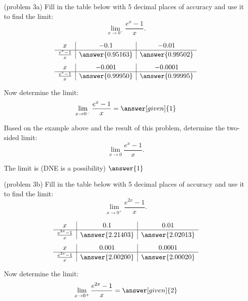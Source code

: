 \documentclass{ximera}
\begin{document}
\begin{problem}(problem 3a)
Fill in the table below with 5 decimal places of accuracy and use it to find the limit:
\[\lim_{x \to 0^-} \frac{e^x - 1}{x}.\]

\begin{prompt}
\begin{center}
\[
\begin{array}{ c | c | c }
  x & -0.1 & -0.01   \\ 
	\hline 
	 \frac{e^x - 1}{x} & \answer{0.95163} & \answer{0.99502} 
\end{array}
\]
\[
\begin{array}{ c | c | c  }
  x  & -0.001 & -0.0001 \\ 
	\hline 
	 \frac{e^x - 1}{x}  & \answer{0.99950} & \answer{0.99995}
\end{array}
\]
\end{center}
Now determine the limit:
\[
\lim_{x \to 0^-} \frac{e^x - 1}{x} = \answer[given]{1}
\]
\end{prompt}

Based on the example above and the result of this problem, determine the two-sided limit:
\[
\lim_{x \to 0} \frac{e^x - 1}{x}.
\]

The limit is (DNE is a possibility) $\answer{1}$

\end{problem}


\begin{problem}(problem 3b)
Fill in the table below with 5 decimal places of accuracy and use it to find the limit:
\[\lim_{x \to 0^+} \frac{e^{2x} - 1}{x}.\]

\begin{prompt}
\begin{center}
\[
\begin{array}{ c | c | c }
  x & 0.1 & 0.01   \\ 
	\hline 
	 \frac{e^{2x} - 1}{x} & \answer{2.21403} & \answer{2.02013} 
\end{array}
\]
\[
\begin{array}{ c | c | c  }
  x  & 0.001 & 0.0001 \\ 
	\hline 
	 \frac{e^{2x} - 1}{x}  & \answer{2.00200} & \answer{2.00020}
\end{array}
\]
\end{center}
Now determine the limit:
\[
\lim_{x \to 0^+} \frac{e^{2x} - 1}{x} = \answer[given]{2}
\]
\end{prompt}
\end{problem}
\end{document}
